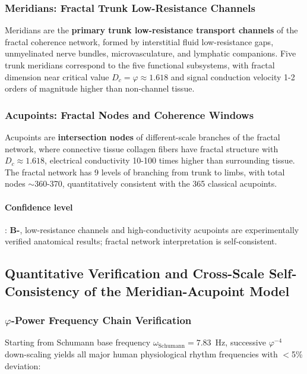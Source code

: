 \documentclass[12pt,a4paper,twocolumn]{article}
\renewcommand{\phi}{\varphi}
\begin{document}
\subsubsection{Meridians: Fractal Trunk Low-Resistance Channels}
Meridians are the \textbf{primary trunk low-resistance transport channels} of the fractal coherence network, formed by interstitial fluid low-resistance gaps, unmyelinated nerve bundles, microvasculature, and lymphatic companions. Five trunk meridians correspond to the five functional subsystems, with fractal dimension near critical value $D_c=\phi\approx1.618$ and signal conduction velocity 1-2 orders of magnitude higher than non-channel tissue.

\subsubsection{Acupoints: Fractal Nodes and Coherence Windows}
Acupoints are \textbf{intersection nodes} of different-scale branches of the fractal network, where connective tissue collagen fibers have fractal structure with $D_c\approx1.618$, electrical conductivity 10-100 times higher than surrounding tissue. The fractal network has 9 levels of branching from trunk to limbs, with total nodes $\sim$360-370, quantitatively consistent with the 365 classical acupoints.

\paragraph{Confidence level}: \textbf{B-}, low-resistance channels and high-conductivity acupoints are experimentally verified anatomical results; fractal network interpretation is self-consistent.


\subsection{Quantitative Verification and Cross-Scale Self-Consistency of the Meridian-Acupoint Model}
\label{subsec:acupoint_quantitative}

\subsubsection{$\phi$-Power Frequency Chain Verification}
Starting from Schumann base frequency $\omega_{\text{Schumann}}=7.83$~Hz, successive $\phi^{-4}$ down-scaling yields all major human physiological rhythm frequencies with $<$5\% deviation:
\end{document}

